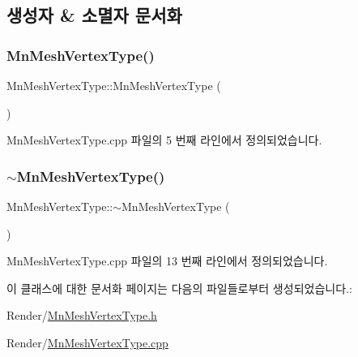 \subsection{생성자 \& 소멸자 문서화}
\mbox{\label{class_m_n_l_1_1_mn_mesh_vertex_type_a54bd7f4f72e1d8a0d470e4778a262596}} 
\subsubsection{\texorpdfstring{Mn\+Mesh\+Vertex\+Type()}{MnMeshVertexType()}}
{\footnotesize\ttfamily Mn\+Mesh\+Vertex\+Type\+::\+Mn\+Mesh\+Vertex\+Type (\begin{DoxyParamCaption}{ }\end{DoxyParamCaption})}



Mn\+Mesh\+Vertex\+Type.\+cpp 파일의 5 번째 라인에서 정의되었습니다.

\mbox{\label{class_m_n_l_1_1_mn_mesh_vertex_type_aa50f0d7d9e5bd3189fb26e8cdff91472}} 
\subsubsection{\texorpdfstring{$\sim$\+Mn\+Mesh\+Vertex\+Type()}{~MnMeshVertexType()}}
{\footnotesize\ttfamily Mn\+Mesh\+Vertex\+Type\+::$\sim$\+Mn\+Mesh\+Vertex\+Type (\begin{DoxyParamCaption}{ }\end{DoxyParamCaption})}



Mn\+Mesh\+Vertex\+Type.\+cpp 파일의 13 번째 라인에서 정의되었습니다.



이 클래스에 대한 문서화 페이지는 다음의 파일들로부터 생성되었습니다.\+:\begin{DoxyCompactItemize}
\item 
Render/\hyperlink{_mn_mesh_vertex_type_8h}{Mn\+Mesh\+Vertex\+Type.\+h}\item 
Render/\hyperlink{_mn_mesh_vertex_type_8cpp}{Mn\+Mesh\+Vertex\+Type.\+cpp}\end{DoxyCompactItemize}
